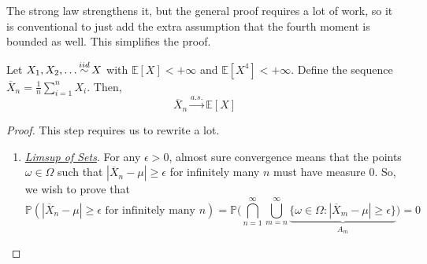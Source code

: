 	The strong law strengthens it, but the general proof requires a lot of work, so it is conventional to just add the extra assumption that the fourth moment is bounded as well. This simplifies the proof. 

  \begin{theorem}
    \label{thm:strong-law-of-large-numbers-4th-moment}
		Let $X_1, X_2, \ldots \iidsim X$ with $\mathbb{E}[X] < +\infty$ and $\mathbb{E}[X^4] < +\infty$. Define the sequence $\overline{X}_n = \frac{1}{n} \sum_{i = 1}^n X_i$. Then, 
		\begin{equation}
			\overline{X}_n \xrightarrow{a.s.} \mathbb{E}[X] 
		\end{equation}
  \end{theorem}
	\begin{proof}
		This step requires us to rewrite a lot. 
		\begin{enumerate}
			\item \textit{\hyperref[st-def:limsup-and-liminf-of-sets]{Limsup of Sets}}. For any $\epsilon > 0$, almost sure convergence means that the points $\omega \in \Omega$ such that $|\overline{X}_n - \mu| \geq \epsilon$ for infinitely many $n$ must have measure $0$. So, we wish to prove that
				\begin{equation}
					\mathbb{P}(|\overline{X}_n - \mu| \geq \epsilon \text{ for infinitely many } n) = \mathbb{P} \bigg( \bigcap_{n=1}^\infty \bigcup_{m=n}^\infty \underbrace{\{ \omega \in \Omega \colon | \overline{X}_m - \mu| \geq \epsilon\}}_{A_m} \bigg) = 0
				\end{equation}


\end{enumerate}
\end{proof}
